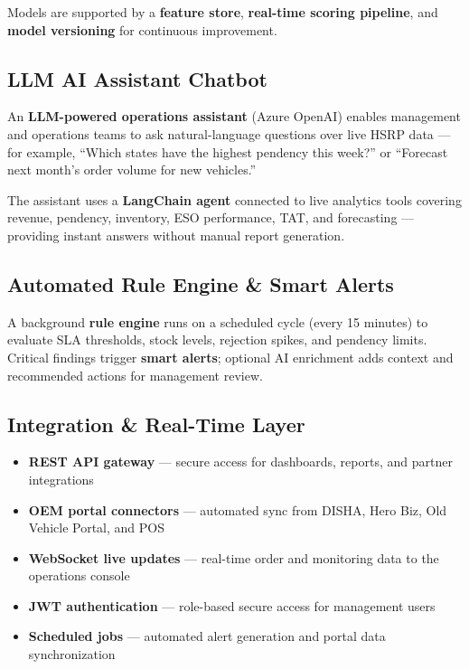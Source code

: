 \documentclass[11pt,a4paper]{article}
\begin{document}
Models are supported by a \textbf{feature store}, \textbf{real-time scoring pipeline}, and \textbf{model versioning} for continuous improvement.

\subsection{LLM AI Assistant Chatbot}

An \textbf{LLM-powered operations assistant} (Azure OpenAI) enables management and operations teams to ask natural-language questions over live HSRP data --- for example, ``Which states have the highest pendency this week?'' or ``Forecast next month's order volume for new vehicles.''

The assistant uses a \textbf{LangChain agent} connected to live analytics tools covering revenue, pendency, inventory, ESO performance, TAT, and forecasting --- providing instant answers without manual report generation.

\subsection{Automated Rule Engine \& Smart Alerts}

A background \textbf{rule engine} runs on a scheduled cycle (every 15 minutes) to evaluate SLA thresholds, stock levels, rejection spikes, and pendency limits. Critical findings trigger \textbf{smart alerts}; optional AI enrichment adds context and recommended actions for management review.

\subsection{Integration \& Real-Time Layer}

\begin{itemize}[leftmargin=1.5em, itemsep=0.25em]
    \item \textbf{REST API gateway} --- secure access for dashboards, reports, and partner integrations
    \item \textbf{OEM portal connectors} --- automated sync from DISHA, Hero Biz, Old Vehicle Portal, and POS
    \item \textbf{WebSocket live updates} --- real-time order and monitoring data to the operations console
    \item \textbf{JWT authentication} --- role-based secure access for management users
    \item \textbf{Scheduled jobs} --- automated alert generation and portal data synchronization
\end{itemize}
\end{document}
